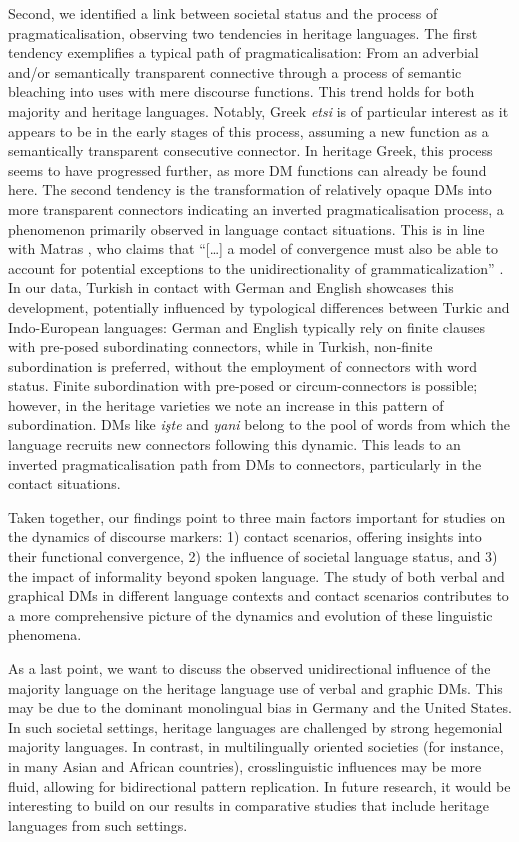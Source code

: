 \documentclass[output=paper,colorlinks,citecolor=brown]{langscibook}
\begin{document}
Second, we identified a link between societal status and the process of pragmaticalisation, observing two tendencies in heritage languages. The first tendency exemplifies a typical path of pragmaticalisation: From an adverbial and/or semantically transparent connective through a process of semantic bleaching into uses with mere discourse functions. This trend holds for both majority and heritage languages. Notably, Greek \textit{etsi} is of particular interest as it appears to be in the early stages of this process, assuming a new function as a semantically transparent consecutive connector. In heritage Greek, this process seems to have progressed further, as more DM functions can already be found here. The second tendency is the transformation of relatively opaque DMs into more transparent connectors indicating an inverted pragmaticalisation process, a phenomenon primarily observed in language contact situations. This is in line with Matras \citep*{matras_grammatical_2007, matras_contact_2010}, who claims that “[…] a model of convergence must also be able to account for potential exceptions to the unidirectionality of grammaticalization” \citep[71]{matras_contact_2010}. In our data, Turkish in contact with German and English showcases this development, potentially influenced by typological differences between Turkic and Indo-European languages: German and English typically rely on finite clauses with pre-posed subordinating connectors, while in Turkish, non-finite subordination is preferred, without the employment of connectors with word status. Finite subordination with pre-posed or circum-connectors is possible; however, in the heritage varieties we note an increase in this pattern of subordination. DMs like \textit{işte} and \textit{yani} belong to the pool of words from which the language recruits new connectors following this dynamic. This leads to an inverted pragmaticalisation path from DMs to connectors, particularly in the contact situations.

Taken together, our findings point to three main factors important for studies on the dynamics of discourse markers: 1) contact scenarios, offering insights into their functional convergence, 2) the influence of societal language status, and 3) the impact of informality beyond spoken language. The study of both verbal and graphical DMs in different language contexts and contact scenarios contributes to a more comprehensive picture of the dynamics and evolution of these linguistic phenomena.

As a last point, we want to discuss the observed unidirectional influence of the majority language on the heritage language use of verbal and graphic DMs. This may be due to the dominant monolingual bias in Germany and the United States. In such societal settings, heritage languages are challenged by strong hegemonial majority languages. In contrast, in multilingually oriented societies (for instance, in many Asian and African countries), crosslinguistic influences may be more fluid, allowing for bidirectional pattern replication. In future research, it would be interesting to build on our results in comparative studies that include heritage languages from such settings.
\end{document}
